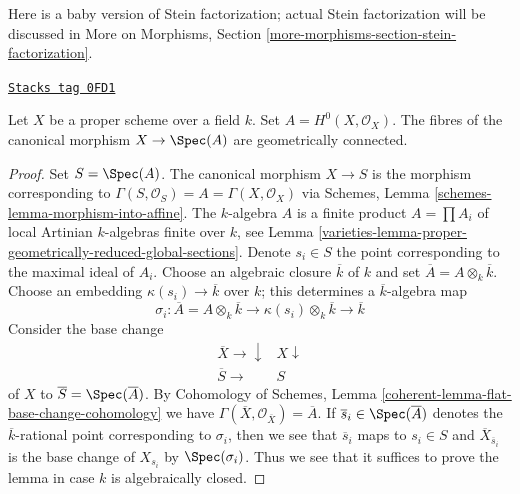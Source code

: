 Here is a baby version of Stein factorization; actual Stein
factorization will be discussed in
More on Morphisms, Section \ref{more-morphisms-section-stein-factorization}.

\begin{lemma}
\label{varieties-lemma-baby-stein}
\href{https://stacks.math.columbia.edu/tag/0FD1}{\texttt{Stacks tag 0FD1}}

Let $X$ be a proper scheme over a field $k$. Set
$A = H^0(X, \mathcal{O}_X)$. The fibres of the canonical
morphism $X \to \Spec(A)$ are geometrically connected.
\end{lemma}

\begin{proof}

Set $S = \Spec(A)$. The canonical morphism $X \to S$
is the morphism corresponding to
$\Gamma(S, \mathcal{O}_S) = A = \Gamma(X, \mathcal{O}_X)$ via
Schemes, Lemma \ref{schemes-lemma-morphism-into-affine}.
The $k$-algebra $A$ is a finite product $A = \prod A_i$
of local Artinian $k$-algebras finite over $k$, see
Lemma \ref{varieties-lemma-proper-geometrically-reduced-global-sections}.
Denote $s_i \in S$ the point corresponding to the maximal
ideal of $A_i$. Choose an algebraic closure $\overline{k}$ of $k$ and
set $\overline{A} = A \otimes_k \overline{k}$.
Choose an embedding $\kappa(s_i) \to \overline{k}$ over $k$; this
determines a $\overline{k}$-algebra map
$$
\sigma_i : \overline{A} = A \otimes_k \overline{k} \to
\kappa(s_i) \otimes_k \overline{k} \to \overline{k}
$$
Consider the base change
$$
\begin{array}{cc}\overline{X} \longrightarrow\downarrow & X \downarrow \\ \overline{S} \longrightarrow & S\end{array}
$$
of $X$ to $\overline{S} = \Spec(\overline{A})$. By
Cohomology of Schemes, Lemma
\ref{coherent-lemma-flat-base-change-cohomology} we have
$\Gamma(\overline{X}, \mathcal{O}_{\overline{X}}) = \overline{A}$.
If $\overline{s}_i \in \Spec(\overline{A})$ denotes the
$\overline{k}$-rational point corresponding to $\sigma_i$,
then we see that $\overline{s}_i$ maps to $s_i \in S$
and $\overline{X}_{\overline{s}_i}$ is the base change of
$X_{s_i}$ by $\Spec(\sigma_i)$. Thus we see that it suffices to prove
the lemma in case $k$ is algebraically closed.


\end{proof}
